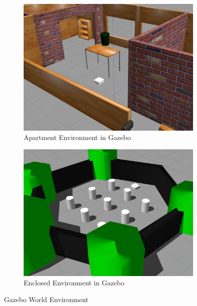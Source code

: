 \begin{figure}[ht]
	\centering
	\begin{subfigure}[b]{0.495\textwidth}
		\centering
		\includegraphics[width=\textwidth]{images/house_env.png}
		\caption{Apartment Environment in Gazebo}
		\label{fig:house_gazebo}
	\end{subfigure}
	\hfill
	\begin{subfigure}[b]{0.495\textwidth}
		\centering
		\includegraphics[width=\textwidth]{images/world_env.png}
		\caption{Enclosed Environment in Gazebo}
		\label{fig:world_gazebo}
	\end{subfigure}
	\caption{Gazebo World Environment}
	\label{fig:three graphs}
\end{figure}

